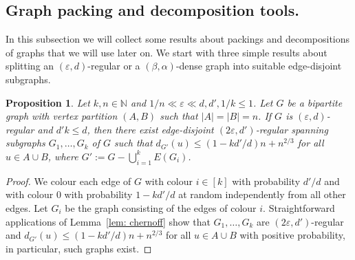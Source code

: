 \documentclass[a4paper, 11pt, reqno]{amsart}
\newtheorem{proposition}[definition]{Proposition}
\numberwithin{equation}{section}
\newcommand{\1}{{\rm 1\hspace*{-0.4ex}%
\rule{0.1ex}{1.52ex}\hspace*{0.2ex}}}
\newcommand{\N}{\mathbb N}
\renewcommand{\epsilon}{\varepsilon}
\begin{document}
\subsection{Graph packing and decomposition tools.}
\label{sec2.4}
In this subsection we will collect some results about packings and decompositions of graphs that we will use later on.
We start with three simple results about splitting an $(\epsilon,d)$-regular or a $(\beta,\alpha)$-dense graph into suitable edge-disjoint subgraphs.

\begin{proposition}\label{prop: part  eps reg}
Let $k,n\in \N$ and $1/n \ll\epsilon \ll  d,d',1/k \leq 1$.
Let $G$ be a bipartite graph with vertex partition $(A,B)$ such that $|A|=|B|=n$.
If $G$ is $(\epsilon,d)$-regular and $d'k\leq d$,
then there exist edge-disjoint $(2\epsilon,d')$-regular spanning subgraphs $G_1,\ldots, G_k$ of $G$ 
such that $d_{G'}(u)\leq (1-kd'/d)n + n^{2/3}$ for all $u\in A\cup B$, where $G':=G-\bigcup_{i=1}^k E(G_i)$.

\end{proposition}
\begin{proof}
We colour each edge of $G$ with colour $i\in [k]$ with probability $d'/d$ and with colour $0$ with probability $1-kd'/d$ at random independently from all other edges. 
Let $G_i$ be the graph consisting of the edges of colour $i$.
Straightforward applications of Lemma~\ref{lem: chernoff} show that $G_1,\ldots,G_k$ are $(2\epsilon,d')$-regular
and  $d_{G'}(u)\leq (1-kd'/d)n + n^{2/3}$ for all $u\in A\cup B$ with positive probability, 
in particular, such graphs exist.
\end{proof}
\end{document}
